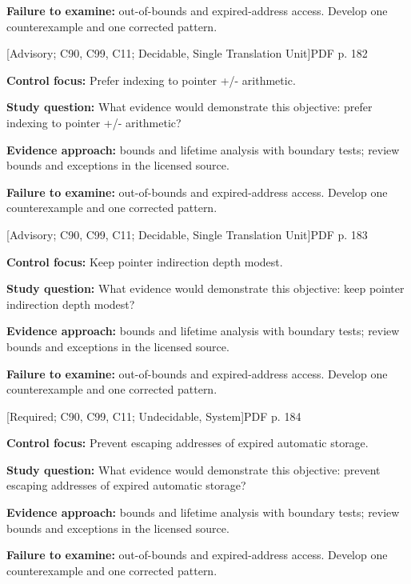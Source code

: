 \documentclass[10pt,letterpaper]{article}
\begin{document}
\textbf{Failure to examine:} out-of-bounds and expired-address access. Develop one counterexample and one corrected pattern.\par
\smallskip
{}
 \textsf{\footnotesize [Advisory; C90, C99, C11; Decidable, Single Translation Unit]}\hfill{\footnotesize PDF p. 182}\par
\textbf{Control focus:} Prefer indexing to pointer +/- arithmetic.\par
\textbf{Study question:} What evidence would demonstrate this objective: prefer indexing to pointer +/- arithmetic?\par
\textbf{Evidence approach:} bounds and lifetime analysis with boundary tests; review bounds and exceptions in the licensed source.\par
\textbf{Failure to examine:} out-of-bounds and expired-address access. Develop one counterexample and one corrected pattern.\par
\smallskip
{}
 \textsf{\footnotesize [Advisory; C90, C99, C11; Decidable, Single Translation Unit]}\hfill{\footnotesize PDF p. 183}\par
\textbf{Control focus:} Keep pointer indirection depth modest.\par
\textbf{Study question:} What evidence would demonstrate this objective: keep pointer indirection depth modest?\par
\textbf{Evidence approach:} bounds and lifetime analysis with boundary tests; review bounds and exceptions in the licensed source.\par
\textbf{Failure to examine:} out-of-bounds and expired-address access. Develop one counterexample and one corrected pattern.\par
\smallskip
{}
 \textsf{\footnotesize [Required; C90, C99, C11; Undecidable, System]}\hfill{\footnotesize PDF p. 184}\par
\textbf{Control focus:} Prevent escaping addresses of expired automatic storage.\par
\textbf{Study question:} What evidence would demonstrate this objective: prevent escaping addresses of expired automatic storage?\par
\textbf{Evidence approach:} bounds and lifetime analysis with boundary tests; review bounds and exceptions in the licensed source.\par
\textbf{Failure to examine:} out-of-bounds and expired-address access. Develop one counterexample and one corrected pattern.\par
\end{document}

